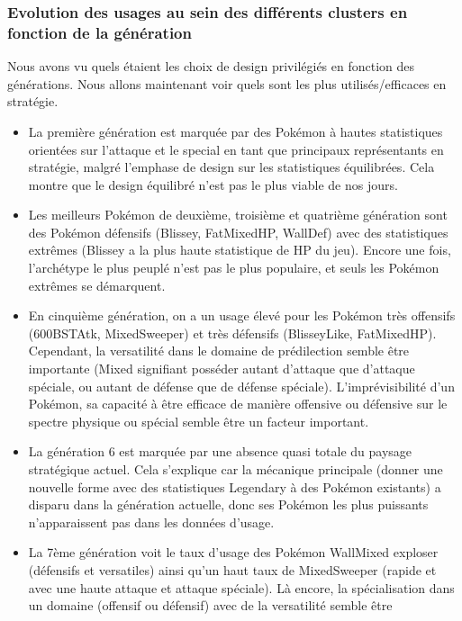 \documentclass[a4paper,12pt]{article}
\begin{document}
\subsubsection{Evolution des usages au sein des différents clusters en fonction de la génération}

Nous avons vu quels étaient les choix de design privilégiés en fonction des
générations. Nous allons maintenant voir quels sont les plus utilisés/efficaces
en stratégie.


\begin{itemize}
    \item La première génération est marquée par des Pokémon à hautes
    statistiques orientées sur l'attaque et le special en tant que principaux
    représentants en stratégie, malgré l'emphase de design sur les statistiques
    équilibrées. Cela montre que le design équilibré n'est pas le plus viable de
    nos jours.
    \item Les meilleurs Pokémon de deuxième, troisième et quatrième génération
    sont des Pokémon défensifs (Blissey, FatMixedHP, WallDef) avec des
    statistiques extrêmes (Blissey a la plus haute statistique de HP du jeu).
    Encore une fois, l'archétype le plus peuplé n'est pas le plus populaire, et
    seuls les Pokémon extrêmes se démarquent.
    \item En cinquième génération, on a un usage élevé pour les Pokémon très
    offensifs (600BSTAtk, MixedSweeper) et très défensifs (BlisseyLike,
    FatMixedHP). Cependant, la versatilité dans le domaine de prédilection
    semble être importante (Mixed signifiant posséder autant d'attaque que
    d'attaque spéciale, ou autant de défense que de défense spéciale).
    L'imprévisibilité d'un Pokémon, sa capacité à être efficace de manière
    offensive ou défensive sur le spectre physique ou spécial semble être un
    facteur important.
    \item La génération 6 est marquée par une absence quasi totale du paysage
    stratégique actuel. Cela s'explique car la mécanique principale (donner une
    nouvelle forme avec des statistiques Legendary à des Pokémon existants) a
    disparu dans la génération actuelle, donc ses Pokémon les plus puissants
    n'apparaissent pas dans les données d'usage.
    \item La 7ème génération voit le taux d'usage des Pokémon WallMixed exploser
    (défensifs et versatiles) ainsi qu'un haut taux de MixedSweeper (rapide et
    avec une haute attaque et attaque spéciale). Là encore, la spécialisation
    dans un domaine (offensif ou défensif) avec de la versatilité semble être

\end{itemize}
\end{document}
